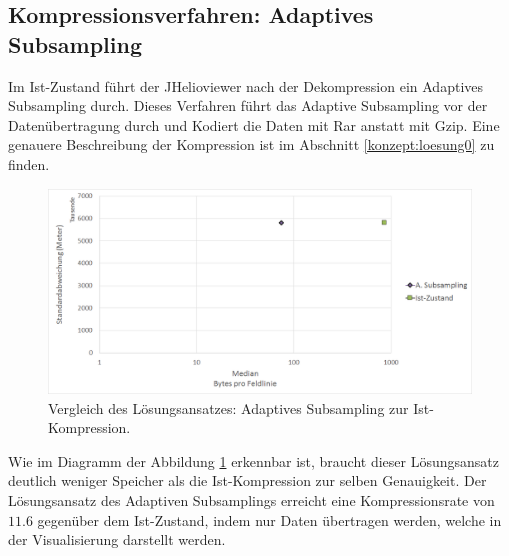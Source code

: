 \subsection{Kompressionsverfahren: Adaptives Subsampling} \label{resultate:loesung0}
Im Ist-Zustand führt der JHelioviewer nach der Dekompression ein Adaptives Subsampling durch. Dieses Verfahren führt das Adaptive Subsampling vor der Datenübertragung durch und Kodiert die Daten mit Rar anstatt mit Gzip. Eine genauere Beschreibung der Kompression ist im Abschnitt \ref{konzept:loesung0} zu finden.

\begin{figure}[!htbp]
	\center
	\includegraphics[width=1\textwidth,keepaspectratio]{./pictures/resultate/loesung0/loesung0_0.png}
	\caption{Vergleich des Lösungsansatzes: Adaptives Subsampling zur Ist-Kompression.}
	\label{resultate:loesung0:loesung0_0}
\end{figure}
Wie im Diagramm der Abbildung \ref{resultate:loesung0:loesung0_0} erkennbar ist, braucht dieser Lösungsansatz deutlich weniger Speicher als die Ist-Kompression zur selben Genauigkeit. Der Lösungsansatz des Adaptiven Subsamplings erreicht eine Kompressionsrate von $11.6$ gegenüber dem Ist-Zustand, indem nur Daten übertragen werden, welche in der Visualisierung darstellt werden.

